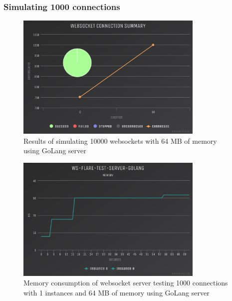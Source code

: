 \subsubsection{Simulating 1000 connections}

\begin{table}[H]
\caption{Cloud Foundry Resource Limits}
\label{table:cf-resource-golang-1000-64}
\end{table}

\begin{figure}[H]
  \centering
    \includegraphics[width=0.8\textwidth]{figures/experiments/experiment-1/golang/conn-1000-64-memory.png}
    \caption{Results of simulating 10000 websockets with 64 MB of memory using GoLang server}
    \label{fig:experiment-1-golang-conn-1000-64}
\end{figure}

\begin{figure}[H]
  \centering
    \includegraphics[width=0.8\textwidth]{figures/experiments/experiment-1/golang/memory-1000-64.png}
    \caption{Memory consumption of websocket server testing 1000 connections with 1 instances and 64 MB of memory using GoLang server}
    \label{fig:experiment-1-golang-memory-1000-64}
\end{figure}

